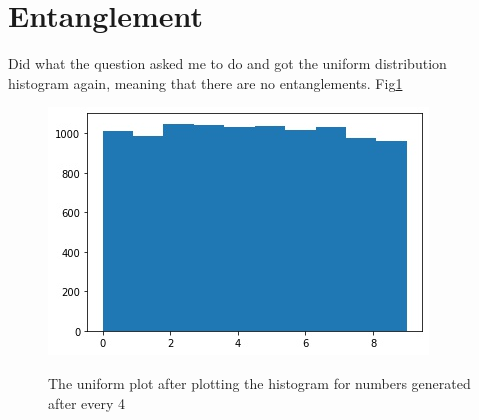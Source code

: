 \documentclass[12pt]{article}
\begin{document}
	\section{Entanglement}
	Did what the question asked me to do and got the uniform distribution histogram again, meaning that
	there are no entanglements. Fig\ref{fig:p2}
	\begin{figure}[h!]
		\includegraphics[width=.9\linewidth]{../p2.jpg}
		\label{fig:p2}
		\caption{The uniform plot after plotting the histogram for numbers generated after every 4}
	\end{figure}
	
\end{document}
